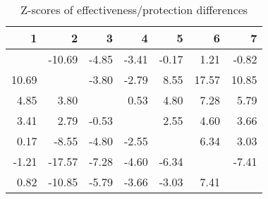 \begin{table}[ht]
\centering
\begin{tabular}{rrrrrrr}
  \hline
1 & 2 & 3 & 4 & 5 & 6 & 7 \\ 
  \hline
 & -10.69 & -4.85 & -3.41 & -0.17 & 1.21 & -0.82 \\ 
  10.69 &  & -3.80 & -2.79 & 8.55 & 17.57 & 10.85 \\ 
  4.85 & 3.80 &  & 0.53 & 4.80 & 7.28 & 5.79 \\ 
  3.41 & 2.79 & -0.53 &  & 2.55 & 4.60 & 3.66 \\ 
  0.17 & -8.55 & -4.80 & -2.55 &  & 6.34 & 3.03 \\ 
  -1.21 & -17.57 & -7.28 & -4.60 & -6.34 &  & -7.41 \\ 
  0.82 & -10.85 & -5.79 & -3.66 & -3.03 & 7.41 &  \\ 
   \hline
\end{tabular}
\caption{Z-scores of effectiveness/protection differences} 
\end{table}
